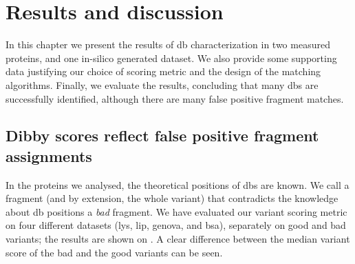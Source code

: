 \chapter{Results and discussion}

In this chapter we present the results of \gls*{db} characterization in two measured proteins, and one in-silico generated dataset. We also provide some supporting data justifying our choice of scoring metric and the design of the matching algorithms. Finally, we evaluate the results, concluding that many \glspl*{db} are successfully identified, although there are many false positive fragment matches.

\section{Dibby scores reflect false positive fragment assignments}

In the proteins we analysed, the theoretical positions of \glspl*{db} are known. We call a fragment (and by extension, the whole variant) that contradicts the knowledge about \gls*{db} positions a \emph{bad} fragment. We have evaluated our variant scoring metric on four different datasets (\gls*{lys}, \gls*{lip}, \gls*{genova}, and \gls*{bsa}), separately on good and bad variants; the results are shown on . A clear difference between the median variant score of the bad and the good variants can be seen.

